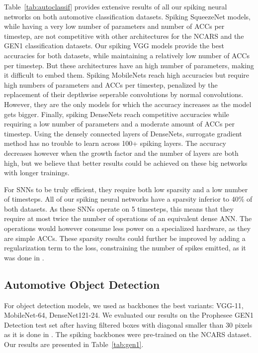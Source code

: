 \documentclass[conference]{IEEEtran}
\begin{document}
Table~\ref{tab:autoclassif} provides extensive results of all our spiking neural networks on both automotive classification datasets. Spiking SqueezeNet models, while having a very low number of parameters and number of ACCs per timestep, are not competitive with other architectures for the NCARS and the GEN1 classification datasets. Our spiking VGG models provide the best accuracies for both datasets, while maintaining a relatively low number of ACCs per timestep. But these architectures have an high number of parameters, making it difficult to embed them. Spiking MobileNets reach high accuracies but require high numbers of parameters and ACCs per timestep, penalized by the replacement of their depthwise seperable convolutions by normal convolutions. However, they are the only models for which the accuracy increases as the model gets bigger. Finally, spiking DenseNets reach competitive accuracies while requiring a low number of parameters and a moderate amount of ACCs per timestep. Using the densely connected layers of DenseNets, surrogate gradient method has no trouble to learn across 100+ spiking layers. The accuracy decreases however when the growth factor and the number of layers are both high, but we believe that better results could be achieved on these big networks with longer trainings. 

For SNNs to be truly efficient, they require both low sparsity and a low number of timesteps. All of our spiking neural networks have a sparsity inferior to 40\% of both datasets. As these SNNs operate on 5 timesteps, this means that they require at most twice the number of operations of an equivalent dense ANN. The operations would however consume less power on a specialized hardware, as they are simple ACCs. These sparsity results could further be improved by adding a regularization term to the loss, constraining the number of spikes emitted, as it was done in \cite{s2net}.

\subsection{Automotive Object Detection}

For object detection models, we used as backbones the best variants: VGG-11, MobileNet-64, DenseNet121-24. We evaluated our results on the Prophesee GEN1 Detection test set after having filtered boxes with diagonal smaller than 30 pixels as it is done in \cite{1mpx}. The spiking backbones were pre-trained on the NCARS dataset. Our results are presented in Table~\ref{tab:gen1}.
\end{document}
